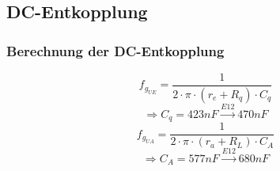 \subsection{DC-Entkopplung}
\begin{frame}
	\frametitle{Berechnung der DC-Entkopplung}
	\[ f_{g_{UE}} = \frac{1}{2 \cdot \pi \cdot (r_e + R_q) \cdot C_q} \]
	\[ \Rightarrow C_q = 423nF \xrightarrow{E12} 470nF \]
	\[ f_{g_{UA}} = \frac{1}{2 \cdot \pi \cdot (r_a + R_L) \cdot C_A} \]
	\[ \Rightarrow C_A = 577nF \xrightarrow{E12} 680nF \]
\end{frame}
